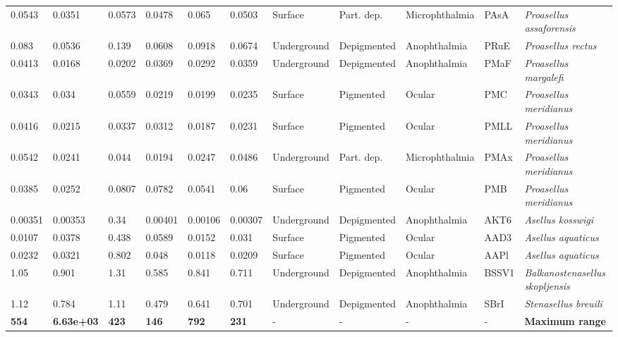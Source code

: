 \begin{tabular}{lllllllllll}
        0.0543 &              0.0351 &         0.0573 &         0.0478 &          0.065 &         0.0503 &      Surface &   Part. dep. &   Microphthalmia &     PAsA &         \textit{Proasellus assaforensis} \\
         0.083 &              0.0536 &          0.139 &         0.0608 &         0.0918 &         0.0674 &  Underground &  Depigmented &     Anophthalmia &     PRuE &               \textit{Proasellus rectus} \\
        0.0413 &              0.0168 &         0.0202 &         0.0369 &         0.0292 &         0.0359 &  Underground &  Depigmented &     Anophthalmia &     PMaF &            \textit{Proasellus margalefi} \\
        0.0343 &               0.034 &         0.0559 &         0.0219 &         0.0199 &         0.0235 &      Surface &    Pigmented &           Ocular &      PMC &           \textit{Proasellus meridianus} \\
        0.0416 &              0.0215 &         0.0337 &         0.0312 &         0.0187 &         0.0231 &      Surface &    Pigmented &           Ocular &     PMLL &           \textit{Proasellus meridianus} \\
        0.0542 &              0.0241 &          0.044 &         0.0194 &         0.0247 &         0.0486 &  Underground &   Part. dep. &   Microphthalmia &     PMAx &           \textit{Proasellus meridianus} \\
        0.0385 &              0.0252 &         0.0807 &         0.0782 &         0.0541 &           0.06 &      Surface &    Pigmented &           Ocular &      PMB &           \textit{Proasellus meridianus} \\
       0.00351 &             0.00353 &           0.34 &        0.00401 &        0.00106 &        0.00307 &  Underground &  Depigmented &     Anophthalmia &     AKT6 &                \textit{Asellus kosswigi} \\
        0.0107 &              0.0378 &          0.438 &         0.0589 &         0.0152 &          0.031 &      Surface &    Pigmented &           Ocular &     AAD3 &               \textit{Asellus aquaticus} \\
        0.0232 &              0.0321 &          0.802 &          0.048 &         0.0118 &         0.0209 &      Surface &    Pigmented &           Ocular &     AAPl &               \textit{Asellus aquaticus} \\
          1.05 &               0.901 &           1.31 &          0.585 &          0.841 &          0.711 &  Underground &  Depigmented &     Anophthalmia &    BSSV1 &  \textit{Balkanostenasellus skopljensis} \\
          1.12 &               0.784 &           1.11 &          0.479 &          0.641 &          0.701 &  Underground &  Depigmented &     Anophthalmia &     SBrI &             \textit{Stenasellus breuili} \\
 \textbf{ 554} &  \textbf{ 6.63e+03} &  \textbf{ 423} &  \textbf{ 146} &  \textbf{ 792} &  \textbf{ 231} &            - &            - &                - &        - &                   \textbf{Maximum range} \\
\bottomrule
\end{tabular}
